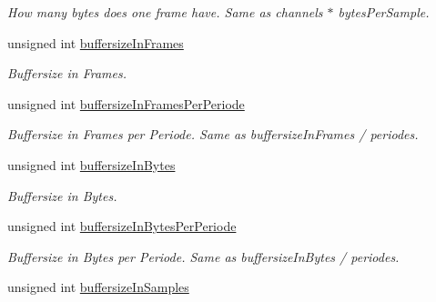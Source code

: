 \begin{DoxyCompactItemize}
\begin{DoxyCompactList}\small\item\em How many bytes does one frame have. Same as channels $\ast$ bytes\-Per\-Sample. \end{DoxyCompactList}\item 
\hypertarget{structNl_1_1SampleSpecs_a221d5b748fbbd0709247e6a288046fe7}{unsigned int \hyperlink{structNl_1_1SampleSpecs_a221d5b748fbbd0709247e6a288046fe7}{buffersize\-In\-Frames}}\label{structNl_1_1SampleSpecs_a221d5b748fbbd0709247e6a288046fe7}

\begin{DoxyCompactList}\small\item\em Buffersize in Frames. \end{DoxyCompactList}\item 
\hypertarget{structNl_1_1SampleSpecs_ab618cd09f45d5e7ef4af9fb74abdec5c}{unsigned int \hyperlink{structNl_1_1SampleSpecs_ab618cd09f45d5e7ef4af9fb74abdec5c}{buffersize\-In\-Frames\-Per\-Periode}}\label{structNl_1_1SampleSpecs_ab618cd09f45d5e7ef4af9fb74abdec5c}

\begin{DoxyCompactList}\small\item\em Buffersize in Frames per Periode. Same as buffersize\-In\-Frames / periodes. \end{DoxyCompactList}\item 
\hypertarget{structNl_1_1SampleSpecs_a448aeb917238293c6661824cea4d40d7}{unsigned int \hyperlink{structNl_1_1SampleSpecs_a448aeb917238293c6661824cea4d40d7}{buffersize\-In\-Bytes}}\label{structNl_1_1SampleSpecs_a448aeb917238293c6661824cea4d40d7}

\begin{DoxyCompactList}\small\item\em Buffersize in Bytes. \end{DoxyCompactList}\item 
\hypertarget{structNl_1_1SampleSpecs_a294961439505dbba77255abccf87b484}{unsigned int \hyperlink{structNl_1_1SampleSpecs_a294961439505dbba77255abccf87b484}{buffersize\-In\-Bytes\-Per\-Periode}}\label{structNl_1_1SampleSpecs_a294961439505dbba77255abccf87b484}

\begin{DoxyCompactList}\small\item\em Buffersize in Bytes per Periode. Same as buffersize\-In\-Bytes / periodes. \end{DoxyCompactList}\item 
\hypertarget{structNl_1_1SampleSpecs_a273b5caf73e4a28ca599d5c28e8773eb}{unsigned int \hyperlink{structNl_1_1SampleSpecs_a273b5caf73e4a28ca599d5c28e8773eb}{buffersize\-In\-Samples}}\label{structNl_1_1SampleSpecs_a273b5caf73e4a28ca599d5c28e8773eb}


\end{DoxyCompactItemize}
